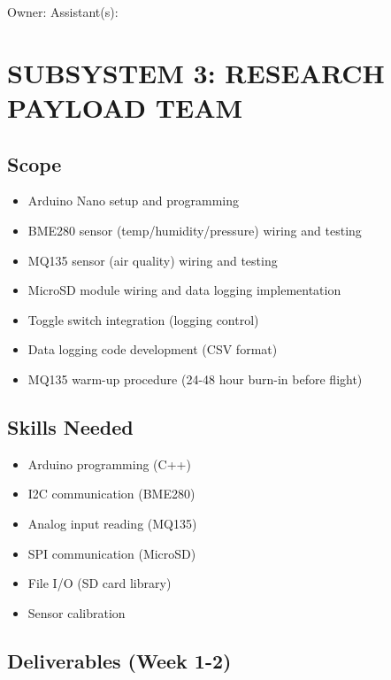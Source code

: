\documentclass[11pt,letterpaper]{article}
\begin{document}
{Owner: \underline{\hspace{4.05cm}}  Assistant(s): \underline{\hspace{4.6499999999999995cm}}\par

\section{SUBSYSTEM 3: RESEARCH PAYLOAD TEAM}

\subsection{Scope}

\begin{itemize}
  \item Arduino Nano setup and programming
  \item BME280 sensor (temp/humidity/pressure) wiring and testing
  \item MQ135 sensor (air quality) wiring and testing
  \item MicroSD module wiring and data logging implementation
  \item Toggle switch integration (logging control)
  \item Data logging code development (CSV format)
  \item MQ135 warm-up procedure (24-48 hour burn-in before flight)
\end{itemize}

\subsection{Skills Needed}

\begin{itemize}
  \item Arduino programming (C++)
  \item I2C communication (BME280)
  \item Analog input reading (MQ135)
  \item SPI communication (MicroSD)
  \item File I/O (SD card library)
  \item Sensor calibration
\end{itemize}

\subsection{Deliverables (Week 1-2)}

}
\end{document}
